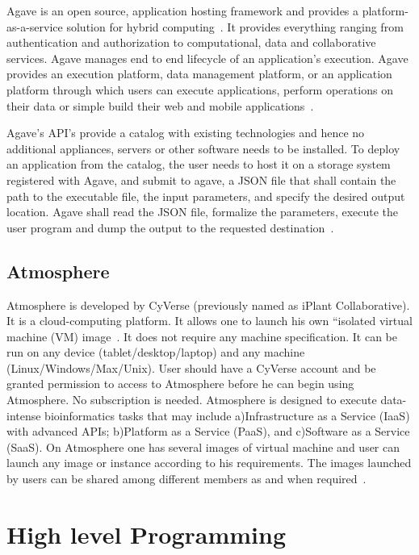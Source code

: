 Agave is an open source, application hosting framework and provides a
platform-as-a-service solution for hybrid
computing~\cite{agave-paper}. It provides everything ranging from
authentication and authorization to computational, data and
collaborative services. Agave manages end to end lifecycle of an
application’s execution.  Agave provides an execution platform, data
management platform, or an application platform through which users
can execute applications, perform operations on their data or simple
build their web and mobile applications~\cite{www-agaveapi-features}.

Agave’s API’s provide a catalog with existing technologies and hence
no additional appliances, servers or other software needs to be
installed. To deploy an application from the catalog, the user needs
to host it on a storage system registered with Agave, and submit to
agave, a JSON file that shall contain the path to the executable file,
the input parameters, and specify the desired output location. Agave
shall read the JSON file, formalize the parameters, execute the user
program and dump the output to the requested
destination~\cite{agave-paper}.

\subsection{Atmosphere}

Atmosphere is developed by CyVerse (previously named as iPlant
Collaborative).  It is a cloud-computing platform. It allows one to
launch his own ``isolated virtual machine (VM) image~\cite{www-at1}.
It does not require any machine specification. It can be run on any
device (tablet/desktop/laptop) and any machine
(Linux/Windows/Max/Unix).  User should have a CyVerse account and be
granted permission to access to Atmosphere before he can begin using
Atmosphere. No subscription is needed.  Atmosphere is designed to
execute data-intense bioinformatics tasks that may include
a)Infrastructure as a Service (IaaS) with advanced APIs; b)Platform as
a Service (PaaS), and c)Software as a Service (SaaS).  On Atmosphere
one has several images of virtual machine and user can launch any
image or instance according to his requirements.  The images launched
by users can be shared among different members as and when
required~\cite{www-at2}.

\section{High level Programming}
\label{S:o-programming}

